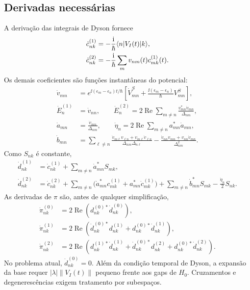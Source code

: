 \subsection{Derivadas necessárias}
A derivação das integrais de Dyson fornece
\begin{align}
 \dot c_{nk}^{(1)}&=-\frac{\mathrm i}{\hbar}\langle n\rvert V_I(t)\lvert k\rangle,\nonumber\\
 \dot c_{nk}^{(2)}&=-\frac{\mathrm i}{\hbar}
                         \sum_m v_{nm}(t)c_{mk}^{(1)}(t).
 \label{eq:cdot}
\end{align}
Os demais coeficientes são funções instantâneas do potencial:
\begin{align}
 \dot v_{mn}
 &=e^{\ii(\epsilon_m-\epsilon_n)t/\hbar}
   \left[\dot V^S_{mn}
       +\frac{\ii(\epsilon_m-\epsilon_n)}{\hbar}V^S_{mn}\right],
 \label{eq:vdot}\\
 \dot E_n^{(1)}&=\dot v_{nn},\qquad
 \dot E_n^{(2)}=2\operatorname{Re}
          \sum_{m\ne n}\frac{v_{mn}^*\dot v_{mn}}{\Delta_{nm}},\nonumber\\
 \dot a_{mn}&=\frac{\dot v_{mn}}{\Delta_{nm}},\qquad
 \dot\eta_n=2\operatorname{Re}\sum_{m\ne n}a_{mn}^*\dot a_{mn},\nonumber\\
 \dot b_{mn}&=\sum_{\ell\ne n}
 \frac{\dot v_{m\ell}v_{\ell n}+v_{m\ell}\dot v_{\ell n}}
      {\Delta_{nm}\Delta_{n\ell}}
 -\frac{\dot v_{nn}v_{mn}+v_{nn}\dot v_{mn}}{\Delta_{nm}^2}.
 \label{eq:abdot}
\end{align}
Como $S_{nk}$ é constante,
\begin{align}
 \dot d_{nk}^{(1)}&=\dot c_{nk}^{(1)}
                     +\sum_{m\ne n}\dot a_{mn}^*S_{mk},\nonumber\\
 \dot d_{nk}^{(2)}&=\dot c_{nk}^{(2)}
 +\sum_{m\ne n}\big(\dot a_{mn}^*c_{mk}^{(1)}
                         +a_{mn}^*\dot c_{mk}^{(1)}\big)
 +\sum_{m\ne n}\dot b_{mn}^*S_{mk}
 -\frac{\dot\eta_n}{2}S_{nk}.
 \label{eq:ddot}
\end{align}
As derivadas de $\pi$ são, antes de qualquer simplificação,
\begin{align}
 \dot\pi_{nk}^{(0)}
 &=2\operatorname{Re}(d_{nk}^{(0)*}\dot d_{nk}^{(0)}),\nonumber\\
 \dot\pi_{nk}^{(1)}
 &=2\operatorname{Re}(\dot d_{nk}^{(0)*}d_{nk}^{(1)}
                     +d_{nk}^{(0)*}\dot d_{nk}^{(1)}),\nonumber\\
 \dot\pi_{nk}^{(2)}
 &=2\operatorname{Re}(d_{nk}^{(1)*}\dot d_{nk}^{(1)}
             +\dot d_{nk}^{(0)*}d_{nk}^{(2)}
             +d_{nk}^{(0)*}\dot d_{nk}^{(2)}).
 \label{eq:pidot}
\end{align}
No problema atual, $\dot d_{nk}^{(0)}=0$.
Além da condição temporal de Dyson, a expansão da base requer
$|\lambda|\|V_I(t)\|$ pequeno frente aos gaps de $H_0$.
Cruzamentos e degenerescências exigem tratamento por subespaços.

